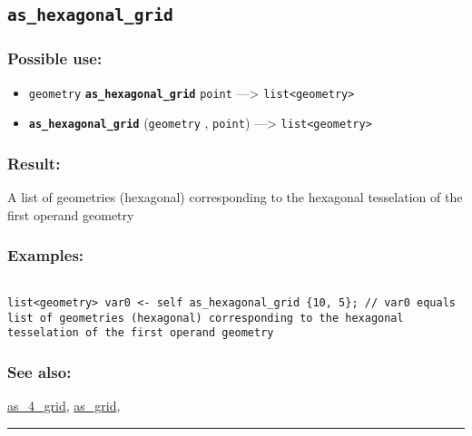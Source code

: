 \documentclass[]{book}
\providecommand{\tightlist}{%
  \setlength{\itemsep}{0pt}\setlength{\parskip}{0pt}}
\theoremstyle{definition}
\theoremstyle{definition}
\theoremstyle{definition}
\theoremstyle{remark}
\begin{document}
\subsection{\texorpdfstring{\texttt{as\_hexagonal\_grid}}{as\_hexagonal\_grid}}\label{as_hexagonal_grid}

\subsubsection{Possible use:}\label{possible-use-49}

\begin{itemize}
\tightlist
\item
  \texttt{geometry} \textbf{\texttt{as\_hexagonal\_grid}} \texttt{point}
  ---\textgreater{} \texttt{list\textless{}geometry\textgreater{}}
\item
  \textbf{\texttt{as\_hexagonal\_grid}} (\texttt{geometry} ,
  \texttt{point}) ---\textgreater{}
  \texttt{list\textless{}geometry\textgreater{}}
\end{itemize}

\subsubsection{Result:}\label{result-48}

A list of geometries (hexagonal) corresponding to the hexagonal
tesselation of the first operand geometry

\subsubsection{Examples:}\label{examples-40}

\begin{verbatim}
 
list<geometry> var0 <- self as_hexagonal_grid {10, 5}; // var0 equals list of geometries (hexagonal) corresponding to the hexagonal tesselation of the first operand geometry
\end{verbatim}

\subsubsection{See also:}\label{see-also-34}

\href{OperatorsAA\#as_4_grid}{as\_4\_grid},
\href{OperatorsAA\#as_grid}{as\_grid},

\begin{center}\rule{0.5\linewidth}{\linethickness}\end{center}
\end{document}

